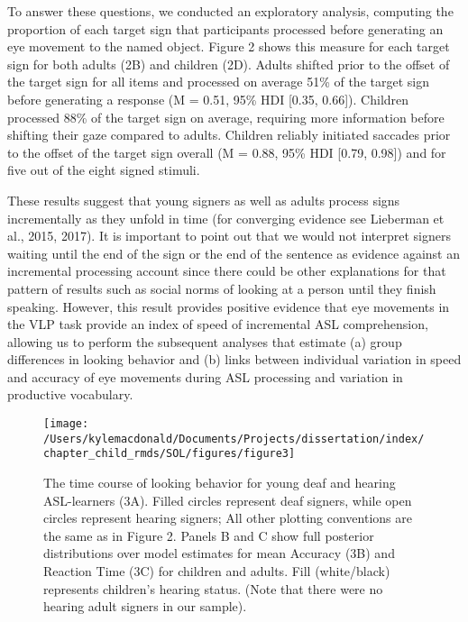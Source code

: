 \documentclass[oneside]{report}
\begin{document}
To answer these questions, we conducted an exploratory analysis,
computing the proportion of each target sign that participants processed
before generating an eye movement to the named object. Figure 2 shows
this measure for each target sign for both adults (2B) and children
(2D). Adults shifted prior to the offset of the target sign for all
items and processed on average 51\% of the target sign before generating
a response (M = 0.51, 95\% HDI {[}0.35, 0.66{]}). Children processed
88\% of the target sign on average, requiring more information before
shifting their gaze compared to adults. Children reliably initiated
saccades prior to the offset of the target sign overall (M = 0.88, 95\%
HDI {[}0.79, 0.98{]}) and for five out of the eight signed stimuli.

These results suggest that young signers as well as adults process signs
incrementally as they unfold in time (for converging evidence see
Lieberman et al., 2015, 2017). It is important to point out that we
would not interpret signers waiting until the end of the sign or the end
of the sentence as evidence against an incremental processing account
since there could be other explanations for that pattern of results such
as social norms of looking at a person until they finish speaking.
However, this result provides positive evidence that eye movements in
the VLP task provide an index of speed of incremental ASL comprehension,
allowing us to perform the subsequent analyses that estimate (a) group
differences in looking behavior and (b) links between individual
variation in speed and accuracy of eye movements during ASL processing
and variation in productive vocabulary.
\begin{figure}[t]

{\centering \texttt{[image: /Users/kylemacdonald/Documents/Projects/dissertation/index/chapter\_child\_rmds/SOL/figures/figure3]} 

}

\caption[The time course of looking behavior for young deaf and hearing ASL-learners]{The time course of looking behavior for young deaf and hearing ASL-learners (3A). Filled circles represent deaf signers, while open circles represent hearing signers; All other plotting conventions are the same as in Figure 2. Panels B and C show full posterior distributions over model estimates for mean Accuracy (3B) and Reaction Time (3C) for children and adults. Fill (white/black) represents children's hearing status. (Note that there were no hearing adult signers in our sample).}\label{fig:sol-tc-coda-figure}
\end{figure}
\end{document}
